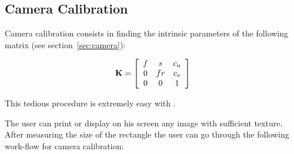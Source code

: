 \subsection{Camera Calibration}
\label{sse:camera_calibration}

\noindent Camera calibration consists in finding the intrinsic parameters of the following matrix (see section~\ref{sec:camera}):

\begin{equation}
\bf{K} = \left[ \begin{array}{ccc} f & s & c_u \\ 0 & f r & c_v \\ 0 & 0 & 1 \end{array} \right]
\end{equation}

\noindent This tedious procedure is extremely easy with \rox{}.

\noindent The user can print or display on his screen any image with sufficient texture. After measuring the size of the rectangle the user can go through the following work-flow for camera calibration: 

